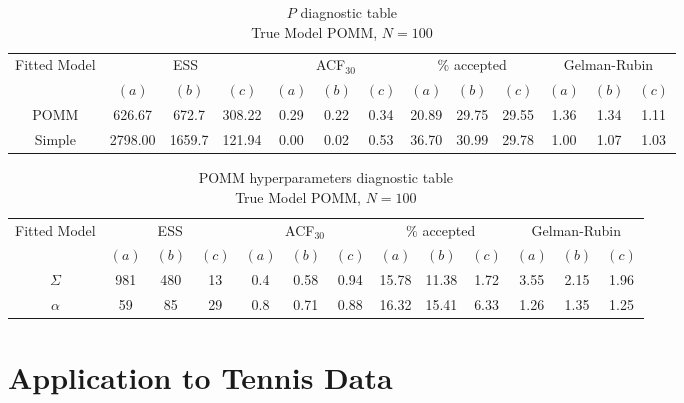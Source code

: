 \documentclass[11pt]{amsart}
\begin{document}
\begin{table}[htbp]
\centering
\caption*{
{\large $P$ diagnostic table} \\ 
{\small True Model POMM, $N=100$}
} 
\begin{tabular}{ccccccccccccc}
\toprule
\multirow{2}{*}{Fitted Model} & \multicolumn{3}{c}{ESS} & \multicolumn{3}{c}{
ACF$_{30}$} & \multicolumn{3}{c}{$\%$ accepted} & \multicolumn{3}{c}{Gelman-Rubin}\\
\cmidrule(lr){2-4} \cmidrule(lr){5-7} \cmidrule(lr){8-10} \cmidrule(lr){11-13} 
& $(a)$ & $(b)$ & $(c)$ & $(a)$ & $(b)$ & $(c)$ & $(a)$ & $(b)$ & $(c)$ & $(a)$ & $(b)$ & $(c)$ \\
\midrule
POMM &626.67 & 672.7 & 308.22 & 0.29 & 0.22 & 0.34 & 20.89 & 29.75 & 29.55 & 1.36 & 1.34 & 1.11    \\
Simple &2798.00 & 1659.7 & 121.94 & 0.00 & 0.02 & 0.53 & 36.70 & 30.99 & 29.78 & 1.00 & 1.07 & 1.03    \\
\bottomrule
\end{tabular}
\label{table:P_diagnostic_POMM}
\end{table}




\begin{table}[htbp]
\centering
\caption*{
{\large POMM hyperparameters diagnostic table} \\ 
{\small True Model POMM, $N=100$}
} 
\begin{tabular}{ccccccccccccc}
\toprule
\multirow{2}{*}{Fitted Model} & \multicolumn{3}{c}{ESS} & \multicolumn{3}{c}{
ACF$_{30}$} & \multicolumn{3}{c}{$\%$ accepted} & \multicolumn{3}{c}{Gelman-Rubin}\\
\cmidrule(lr){2-4} \cmidrule(lr){5-7} \cmidrule(lr){8-10} \cmidrule(lr){11-13} 
& $(a)$ & $(b)$ & $(c)$ & $(a)$ & $(b)$ & $(c)$ & $(a)$ & $(b)$ & $(c)$ & $(a)$ & $(b)$ & $(c)$ \\
\midrule
$\Sigma$ &981 & 480 & 13 & 0.4 & 0.58 & 0.94 & 15.78 & 11.38 & 1.72 & 3.55 & 2.15 & 1.96  \\
$\alpha$ &59 & 85 & 29 & 0.8 & 0.71 & 0.88 & 16.32 & 15.41 & 6.33 & 1.26 & 1.35 & 1.25    \\
\bottomrule
\end{tabular}
\label{table:simulations_from_simple}
\end{table}






\clearpage

\section{Application to Tennis Data}
\end{document}
